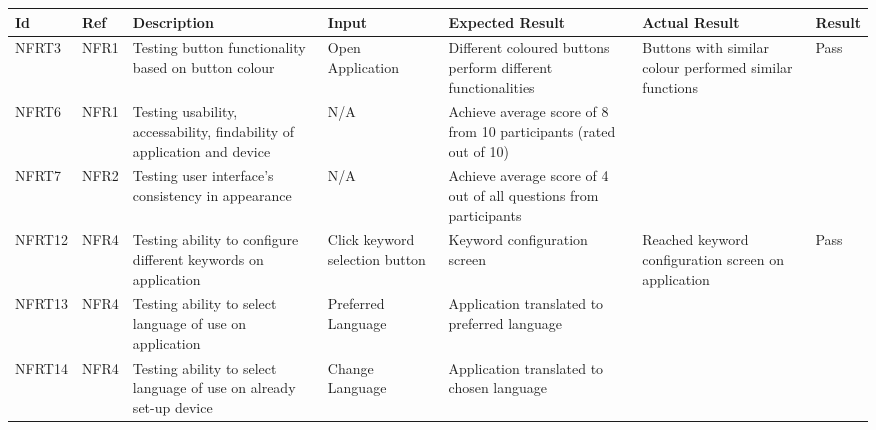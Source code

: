 \documentclass[12pt, titlepage]{article}
\begin{document}
\begin{longtable}{|p{1.4cm}|p{1.0cm}|p{2.5cm}|p{1.5cm}|p{2.2cm}|p{2cm}|p{1.2cm}|}
\endlastfoot
  \hline
  \textbf{Id} & \textbf{Ref} & \textbf{Description}                                                         & \textbf{Input}                                    & \textbf{Expected Result}                                    & \textbf{Actual Result} & \textbf{Result}                                    \\ \hline
  NFRT3        & NFR1          & Testing button functionality based on button colour                     & Open Application                 & Different coloured buttons perform different functionalities    & Buttons with similar colour performed similar functions                        & {\color[HTML]{32CB00} Pass}                        \\ \hline
  NFRT6        & NFR1          & Testing usability, accessability, findability of application and device                     & N/A                              & Achieve average score of 8 from 10 participants (rated out of 10)                           &                       &  \cellcolor[HTML]{FFFFFF}{\color[HTML]{F8A102} TBD}                       \\ \hline
  NFRT7        & NFR2          & Testing user interface's consistency in appearance                     & N/A                              & Achieve average score of 4 out of all questions from participants                       &                        & \cellcolor[HTML]{FFFFFF}{\color[HTML]{F8A102} TBD} \\ \hline
  NFRT12        & NFR4         & Testing ability to configure different keywords on application                    & Click keyword selection button   & Keyword configuration screen                                                   & Reached keyword configuration screen on application                     & {\color[HTML]{32CB00} Pass}                                                    \\ \hline
  NFRT13        & NFR4         & Testing ability to select language of use on application                  & Preferred Language               & Application translated to preferred language                  &                        &           \cellcolor[HTML]{FFFFFF}{\color[HTML]{F8A102} TBD}                                         \\ \hline
  NFRT14        & NFR4         & Testing ability to select language of use on already set-up device                      & Change Language                  & Application translated to chosen language                                      &                        &     \cellcolor[HTML]{FFFFFF}{\color[HTML]{F8A102} TBD}                                               \\ \hline

\end{longtable}
\end{document}
